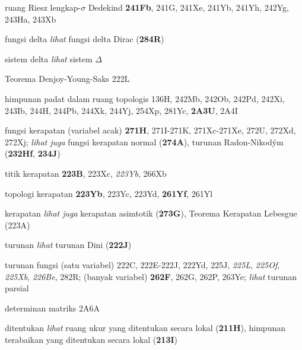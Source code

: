 




ruang Riesz lengkap-$\sigma$ Dedekind {\bf 241Fb}, 241G, 241Xe, 241Yb, 241Yh, 242Yg, 243Ha, 243Xb




fungsi delta {\it lihat} fungsi delta Dirac ({\bf 284R})


sistem delta {\it lihat} sistem $\Delta$




Teorema Denjoy-Young-Saks 222L


himpunan padat dalam ruang topologis 136H,
242Mb, 242Ob, 242Pd, 242Xi, 243Ib, 244H, 244Pb, 244Xk, 244Yj, 254Xp, 281Yc,
{\bf 2A3U}, 2A4I










fungsi kerapatan (variabel acak) {\bf 271H},
271I-271K, 
271Xc-271Xe, 
272U, 272Xd, 272Xj; 
  {\it lihat juga} fungsi kerapatan normal ({\bf 274A}), turunan Radon-Nikod\'ym ({\bf 232Hf}, {\bf 234J})


titik kerapatan {\bf 223B}, 223Xc, {\it 223Yb}, 266Xb


topologi kerapatan {\bf 223Yb}, 223Yc, 223Yd, {\bf 261Yf},
261Yl


kerapatan {\it lihat juga}
  kerapatan asimtotik ({\bf 273G}), Teorema Kerapatan Lebesgue (223A)









turunan {\it lihat} turunan Dini ({\bf 222J})


turunan fungsi (satu variabel) 222C,
222E-222J, 
222Yd, 225J, {\it 225L}, {\it 225Of}, {\it 225Xb}, {\it 226Be}, 282R; (banyak variabel) {\bf 262F}, 262G, 262P, 263Ye; 
  {\it lihat} turunan parsial












determinan matriks 2A6A


ditentukan {\it lihat} ruang ukur yang ditentukan secara lokal ({\bf 211H}),
himpunan terabaikan yang ditentukan secara lokal ({\bf 213I})


